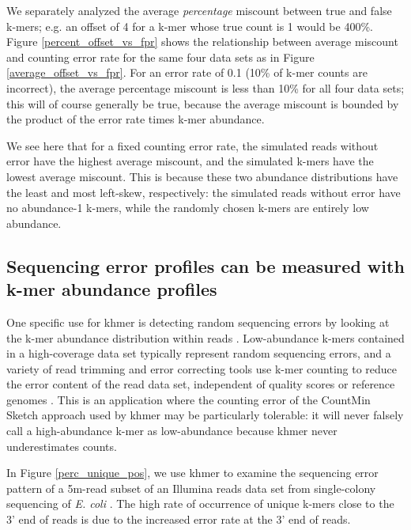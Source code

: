 \documentclass{article}
\begin{document}

We separately analyzed the average {\em percentage} miscount between
true and false k-mers; e.g. an offset of 4 for a k-mer whose true
count is 1 would be 400\%.  Figure \ref{percent_offset_vs_fpr} shows the relationship between average 
miscount and counting error rate for the same four data sets as in Figure \ref{average_offset_vs_fpr}.  For an error rate of 0.1 (10\% of k-mer counts are incorrect), the average percentage miscount is less than 10\% for all four data sets; this will of course generally be true, because the average miscount is bounded by the product of the error rate times k-mer abundance.

We see here that for a fixed counting error rate, the simulated reads
without error have the highest average miscount, and the simulated
k-mers have the lowest average miscount.  This is because these two
abundance distributions have the least and most left-skew,
respectively: the simulated reads without error have no abundance-1
k-mers, while the randomly chosen k-mers are entirely low abundance.

\subsection{Sequencing error profiles can be measured with k-mer abundance
profiles}

One specific use for khmer is detecting random sequencing errors by
looking at the k-mer abundance distribution within reads \cite{Medvedev2011}.
Low-abundance k-mers contained in a high-coverage data set typically
represent random sequencing errors, and a variety of read trimming and
error correcting tools use k-mer counting to reduce the error content
of the read data set, independent of quality scores or reference
genomes \cite{Kelley2010}.  This is an application where the counting
error of the CountMin Sketch approach used by khmer may be
particularly tolerable: it will never falsely call a high-abundance k-mer as low-abundance because khmer never underestimates counts.


In Figure \ref{perc_unique_pos}, we use khmer to examine the
sequencing error pattern of a 5m-read subset of an Illumina reads
data set from single-colony sequencing of {\em E. coli}
\cite{pubmed21926975}.  The high rate of occurrence of unique k-mers
close to the 3' end of reads is due to the increased error rate at the
3' end of reads.
\end{document}
